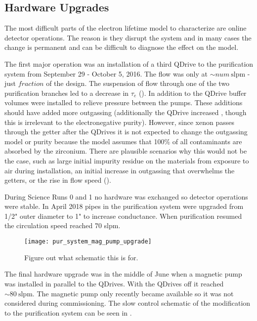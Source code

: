 \subsection{Hardware Upgrades}
\label{subsec:electron_lifetime_model_ops}
The most difficult parts of the electron lifetime model to characterize are online detector operations.  The reason is they disrupt the
system and in many cases the change is permanent and can be difficult to diagnose the effect on the model.

The first major operation was an installation of a third QDrive to the purification system from September 29 - October 5, 2016.  The
flow was only at ${\sim} num\ \mathrm{slpm}$ - just $fraction$ of the design.  The suspension of flow through one of the two purification
branches led to a decrease in $\tau_e$ (\figref{}).  In addition to the QDrive buffer volumes were installed to relieve pressure between
the pumps.  These additions should have added more outgassing
(additionally the QDrive increased , though this is irrelevant to the electronegative purity).  However, since xenon passes
through the
getter after the QDrives it is not expected to change the outgassing model or purity because the model assumes that 100\% of all
contaminants are
absorbed by the zirconium.  There are plausible scenarios why this would not be the case, such as large initial impurity residue on the
materials from exposure to air during installation, an initial increase in outgassing that overwhelms the getters, or the rise
in flow speed ().

During Science Runs 0 and 1 no hardware was exchanged so detector operations were stable.  In April 2018 pipes in the purification
system were upgraded from 1/2" outer diameter to 1" to increase conductance.  When purification resumed the circulation speed reached
70 slpm.

\begin{figure}
\centering
\texttt{[image: pur\_system\_mag\_pump\_upgrade]}
\caption{Figure out what schematic this is for.}
\label{fig:electron_lifetime_model_ops_pur_pipes_upgrade}
\end{figure}

The final hardware upgrade was in the middle of June when a magnetic pump was installed in parallel to the QDrives.  With the QDrives off
it reached ${\sim} 80\ \mathrm{slpm}$.  The magnetic pump only recently became available so it was
not considered during commissioning.  The slow control schematic of the modification to the purification system can be seen in
.

